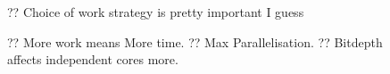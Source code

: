 \documentclass[sigconf,natbib=false]{acmart}
\begin{document}
\begin{figure}
	\caption{?? Choice of work strategy is pretty important I guess}
\end{figure}

\begin{figure}
	\caption{?? More work means More time. ?? Max Parallelisation. ?? Bitdepth affects independent cores more.}
\end{figure}
\end{document}

